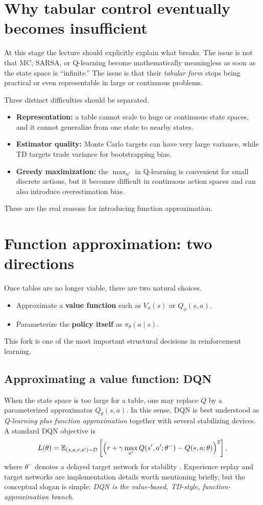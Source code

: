 \documentclass[11pt]{article}
\newcommand{\E}{\mathbb{E}}
\newcommand{\1}{\mathbf{1}}
\begin{document}
\section{Why tabular control eventually becomes insufficient}

At this stage the lecture should explicitly explain what breaks. The issue is not that MC, SARSA, or Q-learning become mathematically meaningless as soon as the state space is ``infinite.'' The issue is that their \emph{tabular form} stops being practical or even representable in large or continuous problems.

Three distinct difficulties should be separated.
\begin{itemize}
    \item \textbf{Representation:} a table cannot scale to huge or continuous state spaces, and it cannot generalize from one state to nearby states.
    \item \textbf{Estimator quality:} Monte Carlo targets can have very large variance, while TD targets trade variance for bootstrapping bias.
    \item \textbf{Greedy maximization:} the $\max_{a'}$ in Q-learning is convenient for small discrete actions, but it becomes difficult in continuous action spaces and can also introduce overestimation bias.
\end{itemize}
These are the real reasons for introducing function approximation.

\section{Function approximation: two directions}

Once tables are no longer viable, there are two natural choices.
\begin{itemize}
    \item Approximate a \textbf{value function} such as $V_\phi(s)$ or $Q_\phi(s,a)$.
    \item Parameterize the \textbf{policy itself} as $\pi_\theta(a\mid s)$.
\end{itemize}
This fork is one of the most important structural decisions in reinforcement learning.

\subsection{Approximating a value function: DQN}

When the state space is too large for a table, one may replace $Q$ by a parameterized approximator $Q_\theta(s,a)$. In this sense, DQN is best understood as \emph{Q-learning plus function approximation} together with several stabilizing devices. A standard DQN objective is
\begin{equation}
L(\theta)=\E_{(s,a,r,s')\sim \mathcal D}\left[\Bigl(r+\gamma\max_{a'}Q(s',a';\theta^-)-Q(s,a;\theta)\Bigr)^2\right],
\end{equation}
where $\theta^-$ denotes a delayed target network for stability \cite{Mnih2015}. Experience replay and target networks are implementation details worth mentioning briefly, but the conceptual slogan is simple: \emph{DQN is the value-based, TD-style, function-approximation branch}.
\end{document}
